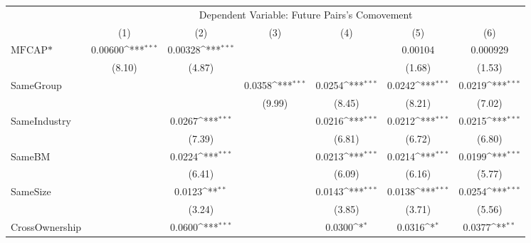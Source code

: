 {
\def\sym#1{\ifmmode^{#1}\else\(^{#1}\)\fi}
\begin{tabular}{l*{6}{c}}
\hline\hline
                    &\multicolumn{6}{c}{Dependent Variable:  Future Pairs's Comovement}                                                                 \\\cmidrule(lr){2-7}
                    &\multicolumn{1}{c}{(1)}         &\multicolumn{1}{c}{(2)}         &\multicolumn{1}{c}{(3)}         &\multicolumn{1}{c}{(4)}         &\multicolumn{1}{c}{(5)}         &\multicolumn{1}{c}{(6)}         \\
\hline
$ \text{MFCAP*} $   &     0.00600\sym{***}&     0.00328\sym{***}&                     &                     &     0.00104         &    0.000929         \\
                    &      (8.10)         &      (4.87)         &                     &                     &      (1.68)         &      (1.53)         \\
[1em]
SameGroup           &                     &                     &      0.0358\sym{***}&      0.0254\sym{***}&      0.0242\sym{***}&      0.0219\sym{***}\\
                    &                     &                     &      (9.99)         &      (8.45)         &      (8.21)         &      (7.02)         \\
[1em]
SameIndustry        &                     &      0.0267\sym{***}&                     &      0.0216\sym{***}&      0.0212\sym{***}&      0.0215\sym{***}\\
                    &                     &      (7.39)         &                     &      (6.81)         &      (6.72)         &      (6.80)         \\
[1em]
SameBM              &                     &      0.0224\sym{***}&                     &      0.0213\sym{***}&      0.0214\sym{***}&      0.0199\sym{***}\\
                    &                     &      (6.41)         &                     &      (6.09)         &      (6.16)         &      (5.77)         \\
[1em]
SameSize            &                     &      0.0123\sym{**} &                     &      0.0143\sym{***}&      0.0138\sym{***}&      0.0254\sym{***}\\
                    &                     &      (3.24)         &                     &      (3.85)         &      (3.71)         &      (5.56)         \\
[1em]
CrossOwnership      &                     &      0.0600\sym{***}&                     &      0.0300\sym{*}  &      0.0316\sym{*}  &      0.0377\sym{**} \\

\end{tabular}}
